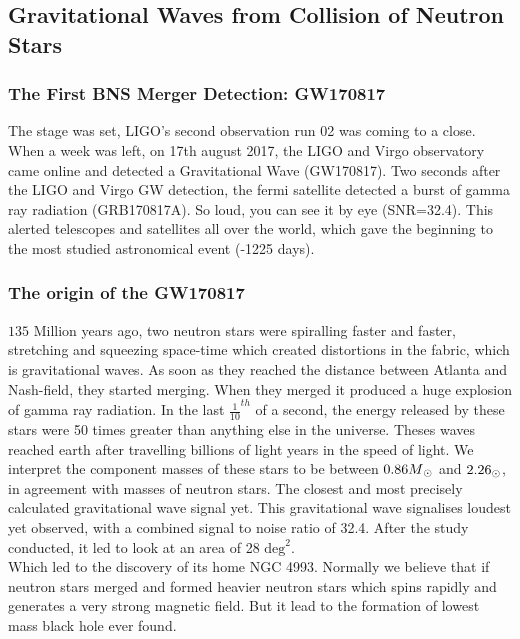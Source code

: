 \subsection{Gravitational Waves from Collision of Neutron Stars}

\subsubsection{The First BNS Merger Detection: GW170817}
 
The stage was set, LIGO's second observation run 02 was coming to a close. When a week was left, on 17th august 2017, the LIGO and Virgo observatory came online and detected a Gravitational Wave (GW170817). Two seconds after the LIGO and Virgo GW detection, the fermi satellite detected a burst of gamma ray radiation (GRB170817A). So loud, you can see it by eye (SNR=32.4). This alerted telescopes and satellites all over the world, which gave the beginning to the most studied astronomical event (-1225 days).  
 
\subsubsection{The origin of the GW170817}
 
$135$ Million years ago, two neutron stars were spiralling faster and faster, stretching and squeezing space-time which created distortions in the fabric, which is gravitational waves. As soon as they reached the distance between Atlanta and Nash-field, they started merging. When they merged it produced a huge explosion of gamma ray radiation. In the last $\frac{1}{10}^{th}$ of a second, the energy released by these stars were 50 times greater than anything else in the universe. Theses waves reached earth after travelling billions of light years in the speed of light. We interpret the component masses of these stars to be between $0.86M\textsubscript{\(\odot\)}$ and $2.26\textsubscript{\(\odot\)}$, in agreement with masses of neutron stars. The closest and most precisely calculated gravitational wave signal yet. This gravitational wave signalises loudest yet observed, with a combined signal to noise ratio of 32.4. After the study conducted, it led to look at an area of 28 $\text{deg}^{2}$.\\
Which led to the discovery of its home NGC 4993. Normally we believe that if neutron stars merged and formed heavier neutron stars which spins rapidly and generates a very strong magnetic field. But it lead to the formation of lowest mass black hole ever found. 
 
